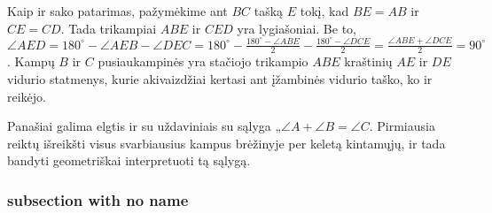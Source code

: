\begin{sprendimas}
  Kaip ir sako patarimas, pažymėkime ant $BC$ tašką $E$ tokį, kad $BE = AB$
  ir $CE = CD$. Tada trikampiai $ABE$ ir $CED$ yra lygiašoniai. Be to,
  $\angle AED = 180^\circ - \angle AEB - \angle DEC = 180^\circ -
  \frac{180^\circ - \angle ABE}{2} - \frac{180^\circ - \angle DCE}{2} =
  \frac{\angle ABE + \angle DCE}{2} = 90^\circ$. Kampų $B$ ir $C$
  pusiaukampinės yra stačiojo trikampio $ABE$ kraštinių $AE$ ir $DE$
  vidurio statmenys, kurie akivaizdžiai kertasi ant įžambinės vidurio
  taško, ko ir reikėjo.
\end{sprendimas}  

Panašiai galima elgtis ir su uždaviniais su sąlyga „$\angle A + \angle B =
\angle C$. Pirmiausia reiktų išreikšti visus svarbiausius kampus brėžinyje
per keletą kintamųjų, ir tada bandyti geometriškai interpretuoti tą sąlygą.

\subsubsection{subsection with no name}

